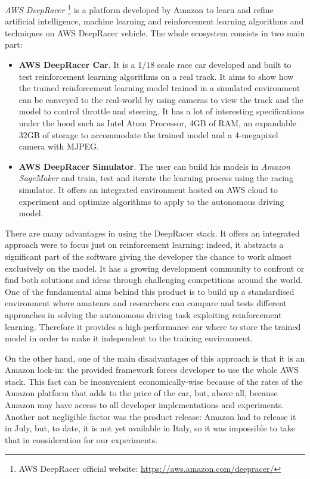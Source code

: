 \textit{AWS DeepRacer} \footnote{AWS DeepRacer official website: \href{https://aws.amazon.com/deepracer/}{https://aws.amazon.com/deepracer/}} is a platform developed by Amazon to learn and refine artificial intelligence, machine learning and reinforcement learning algorithms and techniques on AWS DeepRacer vehicle.
The whole ecosystem consists in two main part:
\begin{itemize}
	\item \textbf{AWS DeepRacer Car}. It is a 1/18 scale race car developed and built to test reinforcement learning algorithms on a real track. It aims to show how the trained reinforcement learning model trained in a simulated environment can be conveyed to the real-world by using cameras to view the track and the model to control throttle and steering. It has a lot of interesting specifications under the hood such as Intel Atom\textsuperscript{\textregistered} Processor, 4GB of RAM, an expandable 32GB of storage to accommodate the trained model and a 4-megapixel camera with MJPEG.
	\item \textbf{AWS DeepRacer Simulator}. The user can build his models in \textit{Amazon SageMaker} and train, test and iterate the learning process using the racing simulator. It offers an integrated environment hosted on AWS cloud to experiment and optimize algorithms to apply to the autonomous driving model.
\end{itemize}

There are many advantages in using the DeepRacer stack. It offers an integrated approach were to focus just on reinforcement learning: indeed, it abstracts a significant part of the software giving the developer the chance to work almost exclusively on the model. It has a growing development community to confront or find both solutions and ideas through challenging competitions around the world. One of the fundamental aims behind this product is to build up a standardised environment where amateurs and researchers can compare and tests different approaches in solving the autonomous driving task exploiting reinforcement learning. Therefore it provides a high-performance car where to store the trained model in order to make it independent to the training environment.

On the other hand, one of the main disadvantages of this approach is that it is an Amazon lock-in: the provided framework forces developer to use the whole AWS stack. This fact can be inconvenient economically-wise because of the rates of the Amazon platform that adds to the price of the car, but, above all, because Amazon may have access to all developer implementations and experiments.
Another not negligible factor was the product release: Amazon had to release it in July, but, to date, it is not yet available in Italy, so it was impossible to take that in consideration for our experiments.

